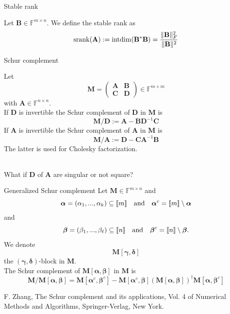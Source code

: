 \documentclass{beamer}
\newcommand{\bgk}[1]{\boldsymbol{#1}}
\newcommand{\balpha}{\bgk{\alpha}}
\newcommand{\bbeta}{\bgk{\beta}}
\newcommand{\bgamma}{\bgk{\gamma}}
\newcommand{\bdelta}{\bgk{\delta}}
\newcommand{\bvec}[1]{\mathbf{#1}}
\newcommand{\vA}{\bvec{A}}
\newcommand{\vB}{\bvec{B}}
\newcommand{\vC}{\bvec{C}}
\newcommand{\vD}{\bvec{D}}
\newcommand{\vM}{\bvec{M}}
\begin{document}
\begin{frame}{Stable rank}

Let $\vB \in \mathbb{F}^{m \times n}$. We define the stable rank as
$$
{\rm srank}(\vA)
:=
{\rm intdim}(\vB^*\vB)
=
\frac{\Vert \vB \Vert_F^2}{\Vert \vB \Vert^2}
$$
    
\end{frame}

\begin{frame}{Schur complement}

Let 
$$
\vM = 
\begin{pmatrix}
\vA & \vB \\
\vC & \vD
\end{pmatrix} \in \mathbb{F}^{m \times m}
$$
with $\vA \in \mathbb{F}^{n \times n}$.\\
If $\vD$ is invertible the Schur complement of $\vD$ in $\vM$ is
$$
\vM/\vD
:=
\vA - \vB \vD^{-1} \vC
$$
If $\vA$ is invertible the Schur complement of $\vA$ in $\vM$ is
$$
\vM/\vA
:=
\vD - \vC \vA^{-1} \vB
$$
The latter is used for Cholesky factorization.\\
~\\
\begin{center}
What if $\vD$ of $\vA$ are singular or not square?
\end{center}

\end{frame}


\begin{frame}{Generalized Schur complement}
Let $\vM\in\mathbb{F}^{m \times n}$ and 
$$
\balpha = (\alpha_1, ...,\alpha_k) \subseteq [\![ m ]\!]
\quad {\rm and} \quad  
\balpha^c = [\![ m ]\!] \setminus  \balpha
$$
and
$$
\bbeta = (\beta_1, ...,\beta_\ell) \subseteq [\![ n ]\!]
\quad {\rm and} \quad  
\bbeta^c = [\![ n ]\!] \setminus  \bbeta.
$$
We denote $$
\vM[\bgamma, \bdelta] 
$$
the $(\bgamma, \bdelta)$-block in $\vM$.\\
The Schur complement of $\vM[\balpha, \bbeta]$ in $\vM$ is
$$
\vM / \vM[\balpha, \bbeta]
=
\vM[\balpha^c, \bbeta^c]
-
\vM[\balpha^c, \bbeta] \left(\vM[\balpha, \bbeta] \right)^\dagger \vM[\balpha, \bbeta^c]
$$

\vfill
\begin{footnotesize}
F. Zhang, The Schur complement and its applications, Vol. 4 of Numerical Methods and Algorithms,
Springer-Verlag, New York.
\end{footnotesize}
\end{frame}
\end{document}
